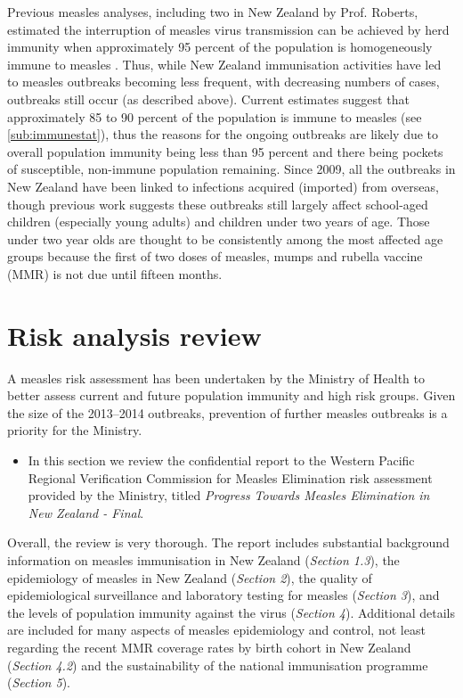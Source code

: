 \documentclass{article}
\begin{document}
Previous measles analyses, including two in New Zealand by Prof. Roberts, estimated the interruption of measles virus transmission can be achieved by herd immunity when approximately 95 percent of the population is homogeneously immune to measles \citep{roberts0,roberts4}.
Thus, while New Zealand immunisation activities have led to measles outbreaks becoming less frequent, with decreasing numbers of cases, outbreaks still occur (as described above). Current estimates suggest that approximately 85 to 90 percent of the population is immune to measles (see \autoref{sub:immunestat}), thus the reasons for the ongoing outbreaks are likely due to overall population immunity being less than 95 percent and there being pockets of susceptible, non-immune population remaining. Since 2009, all the outbreaks in New Zealand have been linked to infections acquired (imported) from overseas, though previous work suggests these outbreaks still largely affect school-aged children (especially young adults) and children under two years of age. Those under two year olds are thought to be consistently among the most affected age groups because the first of two doses of measles, mumps and rubella vaccine (MMR) is not due until fifteen months.

\section{Risk analysis review}

A measles risk assessment has been undertaken by the Ministry of Health to better assess current and future population immunity and high risk groups. Given the size of the 2013--2014 outbreaks, prevention of further measles outbreaks is a priority for the Ministry.
\begin{itemize}
\item In this section we review the confidential report to the Western Pacific Regional Verification Commission for Measles Elimination risk assessment provided by the Ministry, titled \emph {Progress Towards Measles Elimination in New Zealand - Final}.
\end{itemize}

Overall, the review is very thorough. The report includes substantial background information on measles immunisation in New Zealand (\emph{Section 1.3}), the epidemiology of measles in New Zealand (\emph{Section 2}), the quality of epidemiological surveillance and laboratory testing for measles (\emph{Section 3}), and the levels of population immunity against the virus (\emph{Section 4}). Additional details are included for many aspects of measles epidemiology and control, not least regarding the recent MMR coverage rates by birth cohort in New Zealand (\emph{Section 4.2}) and the sustainability of the national immunisation programme (\emph{Section 5}).
\end{document}
